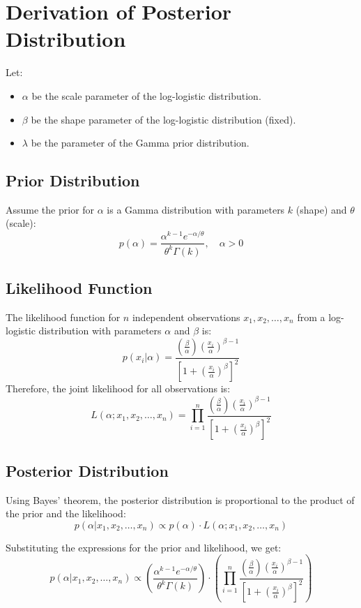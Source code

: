 \documentclass{article}
\begin{document}
\section*{Derivation of Posterior Distribution}

Let:
\begin{itemize}
    \item $\alpha$ be the scale parameter of the log-logistic distribution.
    \item $\beta$ be the shape parameter of the log-logistic distribution (fixed).
    \item $\lambda$ be the parameter of the Gamma prior distribution.
\end{itemize}

\subsection*{Prior Distribution}

Assume the prior for $\alpha$ is a Gamma distribution with parameters $k$ (shape) and $\theta$ (scale):
\[
p(\alpha) = \frac{\alpha^{k-1} e^{-\alpha/\theta}}{\theta^k \Gamma(k)}, \quad \alpha > 0
\]

\subsection*{Likelihood Function}

The likelihood function for $n$ independent observations $x_1, x_2, \ldots, x_n$ from a log-logistic distribution with parameters $\alpha$ and $\beta$ is:
\[
p(x_i | \alpha) = \frac{\left(\frac{\beta}{\alpha}\right) \left(\frac{x_i}{\alpha}\right)^{\beta-1}}{\left[1 + \left(\frac{x_i}{\alpha}\right)^{\beta}\right]^2}
\]
Therefore, the joint likelihood for all observations is:
\[
L(\alpha; x_1, x_2, \ldots, x_n) = \prod_{i=1}^{n} \frac{\left(\frac{\beta}{\alpha}\right) \left(\frac{x_i}{\alpha}\right)^{\beta-1}}{\left[1 + \left(\frac{x_i}{\alpha}\right)^{\beta}\right]^2}
\]

\subsection*{Posterior Distribution}

Using Bayes' theorem, the posterior distribution is proportional to the product of the prior and the likelihood:
\[
p(\alpha | x_1, x_2, \ldots, x_n) \propto p(\alpha) \cdot L(\alpha; x_1, x_2, \ldots, x_n)
\]

Substituting the expressions for the prior and likelihood, we get:
\[
p(\alpha | x_1, x_2, \ldots, x_n) \propto \left( \frac{\alpha^{k-1} e^{-\alpha/\theta}}{\theta^k \Gamma(k)} \right) \cdot \left( \prod_{i=1}^{n} \frac{\left(\frac{\beta}{\alpha}\right) \left(\frac{x_i}{\alpha}\right)^{\beta-1}}{\left[1 + \left(\frac{x_i}{\alpha}\right)^{\beta}\right]^2} \right)
\]
\end{document}
